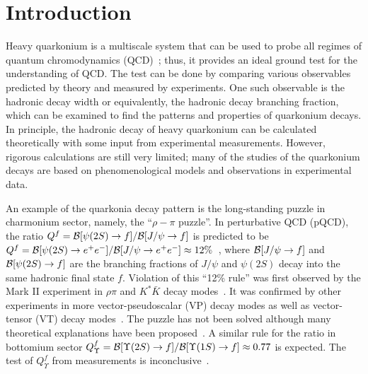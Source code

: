 \documentclass[%
preprint,
 amsmath,amssymb,
 aps,
]{revtex4-2}
\newcommand{\br}{{\cal B}}
\newcommand{\EE}{e^+e^-}
\newcommand{\psip}{\psi(2S)}
\newcommand{\jpsi}{J/\psi}
\newcommand{\upsi}{\Upsilon(1S)}
\newcommand{\upsip}{\Upsilon(2S)}
\begin{document}

\section{\label{sec:intro}Introduction}

Heavy quarkonium is a multiscale system that can be used to probe all regimes 
of quantum chromodynamics (QCD)~\cite{BrambillaN-EidelmanS-HeltsleyBK}; thus, it 
provides an ideal ground test for the understanding of QCD. The test can be done 
by comparing various observables predicted by theory and measured by experiments. 
One such observable is the hadronic decay width or equivalently, the hadronic decay 
branching fraction, which can be examined to find the patterns and properties of 
quarkonium decays. In principle,  the hadronic decay of heavy quarkonium can be 
calculated theoretically with some input from experimental measurements. 
However, rigorous calculations are still very limited; many of the studies of the quarkonium 
decays are based on phenomenological models and observations in experimental data.

An example of the quarkonia decay pattern is the long-standing puzzle in charmonium 
sector, namely, the ``$\rho-\pi$ puzzle''. 
In perturbative QCD (pQCD), the ratio $Q^{f}=\br[\psip\to f]/\br[\jpsi\to f]$ is predicted 
to be $Q^{f}=\br[\psip\to\EE]/\br[\jpsi\to\EE]\approx 12\%$~\cite{rho-pi-12-rule}, where 
$\br[\jpsi\to f]$ and $\br[\psip\to f]$ are the branching fractions of $\jpsi$ and $\psip$ decay 
into the same hadronic final state $f$.
Violation of this ``12\% rule'' was first observed by the Mark II experiment in 
$\rho\pi$ and $K^{*}\bar{K}$ decay modes~\cite{MarkII-rhopi-1983}. It was confirmed 
by other experiments in more vector-pseudoscalar (VP) decay modes as well as 
vector-tensor (VT) decay modes~\cite{rhopi-CERN2005}. The puzzle has not been 
solved although many theoretical explanations have been proposed~\cite{rhopi-review-2007}. 
A similar rule for the ratio in bottomium sector
$Q^{f}_{\Upsilon}=\br[\upsip\to f]/\br[\upsi\to f]\approx0.77$
is expected. The test of $Q^{f}_{\Upsilon}$ from measurements is
inconclusive~\cite{upsilon-decay-belle,upsilon-belle2,upsilon-cleo}. 
\end{document}
